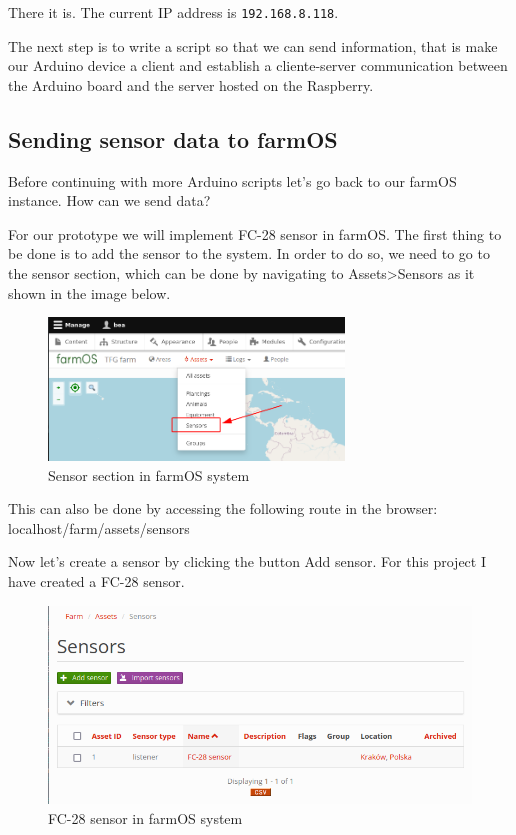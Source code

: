 There it is. The current IP address is \verb|192.168.8.118|.

The next step is to write a script so that we can send information, that is make our Arduino device a client and establish a cliente-server communication between the Arduino board and the server hosted on the Raspberry.

\subsection{Sending sensor data to farmOS}
Before continuing with more Arduino scripts let's go back to our farmOS instance. How can we send data?

For our prototype we will implement FC-28 sensor in farmOS. The first thing to be done is to add the sensor to the system. In order to do so, we need to go to the sensor section, which can be done by navigating to Assets>Sensors as it shown in the image below.

\begin{figure}[H]
    \centering
    \includegraphics[width=0.7\textwidth]{fig/drupal-install/select-sensor.png}
    \caption{Sensor section in farmOS system}
    \label{fig:select-sensor}
\end{figure}

This can also be done by accessing the following route in the browser: localhost/farm/assets/sensors

Now let's create a sensor by clicking the button Add sensor. For this project I have created a FC-28 sensor.

\begin{figure}[H]
    \centering
    \includegraphics[width=1\textwidth]{fig/drupal-install/created-sensor.png}
    \caption{FC-28 sensor in farmOS system}
    \label{fig:created-sensor}
\end{figure}


